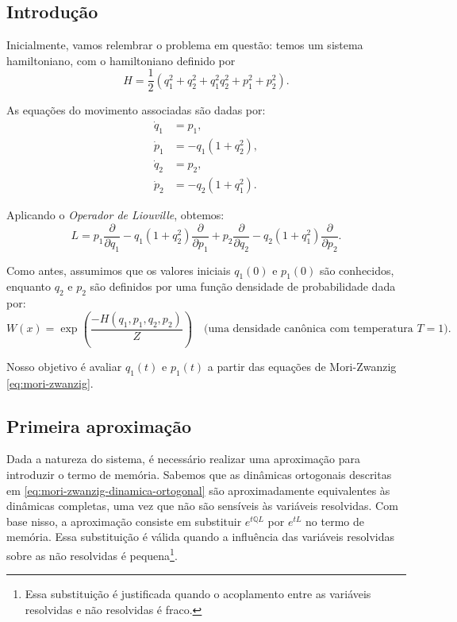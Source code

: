 \documentclass[12pt]{article}
\begin{document}
\subsection{Introdução}
Inicialmente, vamos relembrar o problema em questão: temos um sistema hamiltoniano, com o hamiltoniano definido por  
\begin{equation*}
	H = \frac{1}{2}(q_1^2 + q_2^2 + q_1^2 q_2^2 + p_1^2 + p_2^2).
\end{equation*}

As equações do movimento associadas são dadas por:  
\begin{align*}
	\dot{q}_1 & = p_1, \nonumber             \\
	\dot{p}_1 & = -q_1(1 + q_2^2), \nonumber \\
	\dot{q}_2 & = p_2, \nonumber             \\
	\dot{p}_2 & = -q_2(1 + q_1^2).           
\end{align*}

Aplicando o \textit{Operador de Liouville}, obtemos:  
\begin{equation*}
	L = p_1 \frac{\partial}{\partial q_1} - q_1(1 + q_2^2)\frac{\partial}{\partial p_1}
	+ p_2 \frac{\partial}{\partial q_2} - q_2(1 + q_1^2)\frac{\partial}{\partial p_2}.
\end{equation*}

Como antes, assumimos que os valores iniciais $q_1(0)$ e $p_1(0)$ são conhecidos, enquanto $q_2$ e $p_2$ são definidos por uma função densidade de probabilidade dada por:
\begin{equation*}
	W(x) = \exp\left(\frac{-H(q_1,p_1,q_2,p_2)}{Z}\right) \quad \text{(uma densidade canônica com temperatura $T = 1$).}
\end{equation*}

Nosso objetivo é avaliar $q_1(t)$ e $p_1(t)$ a partir das equações de Mori-Zwanzig \eqref{eq:mori-zwanzig}.

\subsection{Primeira aproximação}
Dada a natureza do sistema, é necessário realizar uma aproximação para introduzir o termo de memória. Sabemos que as dinâmicas ortogonais descritas em \eqref{eq:mori-zwanzig-dinamica-ortogonal} são aproximadamente equivalentes às dinâmicas completas, uma vez que não são sensíveis às variáveis resolvidas. Com base nisso, a aproximação consiste em substituir $e^{t\mathbb{Q}L}$ por $e^{tL}$ no termo de memória. Essa substituição é válida quando a influência das variáveis resolvidas sobre as não resolvidas é pequena\footnote{Essa substituição é justificada quando o acoplamento entre as variáveis resolvidas e não resolvidas é fraco.}. 
\end{document}

